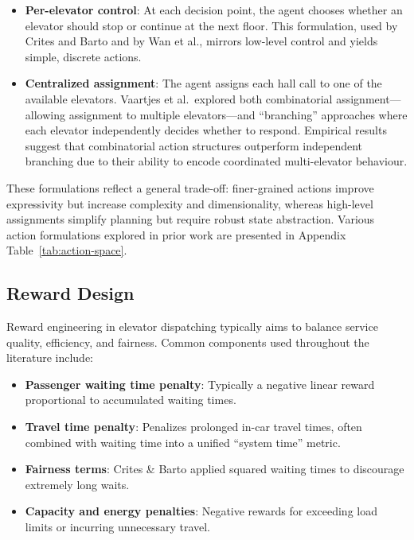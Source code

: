 \documentclass[10pt,twocolumn]{article}
\begin{document}
\begin{itemize}
    \item \textbf{Per-elevator control}: At each decision point, the agent chooses whether an elevator should stop or continue at the next floor. This formulation, used by Crites and Barto and by Wan et al., mirrors low-level control and yields simple, discrete actions\cite{CRITES1995}\cite{WAN2024}.
    \item \textbf{Centralized assignment}: The agent assigns each hall call to one of the available elevators. Vaartjes et al.\ explored both combinatorial assignment---allowing assignment to multiple elevators---and ``branching'' approaches where each elevator independently decides whether to respond\cite{VAARTJES2025}. Empirical results suggest that combinatorial action structures outperform independent branching due to their ability to encode coordinated multi-elevator behaviour.
\end{itemize}

These formulations reflect a general trade-off: finer-grained actions improve expressivity but increase complexity and dimensionality, whereas high-level assignments simplify planning but require robust state abstraction. Various action formulations explored in prior work are presented in Appendix Table~\ref{tab:action-space}.

\subsection{Reward Design}

Reward engineering in elevator dispatching typically aims to balance service quality, efficiency, and fairness. Common components used throughout the literature include:

\begin{itemize}
    \item \textbf{Passenger waiting time penalty}: Typically a negative linear reward proportional to accumulated waiting times.
    \item \textbf{Travel time penalty}: Penalizes prolonged in-car travel times, often combined with waiting time into a unified ``system time'' metric.
    \item \textbf{Fairness terms}: Crites \& Barto applied squared waiting times to discourage extremely long waits.
    \item \textbf{Capacity and energy penalties}: Negative rewards for exceeding load limits or incurring unnecessary travel.
\end{itemize}
\end{document}
